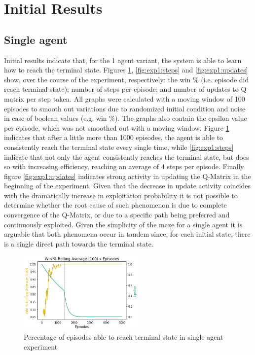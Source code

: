 \documentclass[11pt]{article}
\begin{document}
\section{Initial Results}
    \subsection{Single agent}
        Initial results indicate that, for the 1 agent variant, the system is able to learn how to reach the terminal state. Figures \ref{fig:exp1:win_percent}, \ref{fig:exp1:steps} and \ref{fig:exp1:updates} show, over the course of the experiment, respectively: the win \% (i.e. episode did reach terminal state); number of steps per episode; and number of updates to Q matrix per step taken. All graphs were calculated with a moving window of 100 episodes to smooth out variations due to randomized initial condition and noise in case of boolean values (e.g. win \%). The graphs also contain the epsilon value per episode, which was not smoothed out with a moving window. Figure \ref{fig:exp1:win_percent} indicates that after a little more than 1000 episodes, the agent is able to consistently reach the terminal state every single time, while \ref{fig:exp1:steps} indicate that not only the agent consistently reaches the terminal state, but does so with increasing efficiency, reaching an average of 4 steps per episode. Finally figure \ref{fig:exp1:updates} indicates strong activity in updating the Q-Matrix in the beginning of the experiment. Given that the decrease in update activity coincides with the dramatically increase in exploitation probability it is not possible to determine whether the root cause of such phenomenon is due to complete convergence of the Q-Matrix, or due to a specific path being preferred and continuously exploited. Given the simplicity of the maze for a single agent it is arguable that both phenomena occur in tandem since, for each initial state, there is a single direct path towards the terminal state.
        \begin{figure}[h]
            \includegraphics[height=4cm]{Images/exp_1/1_win_percent.png}
            \caption{Percentage of episodes able to reach terminal state in single agent experiment}
            \label{fig:exp1:win_percent}
        \end{figure}
\end{document}
